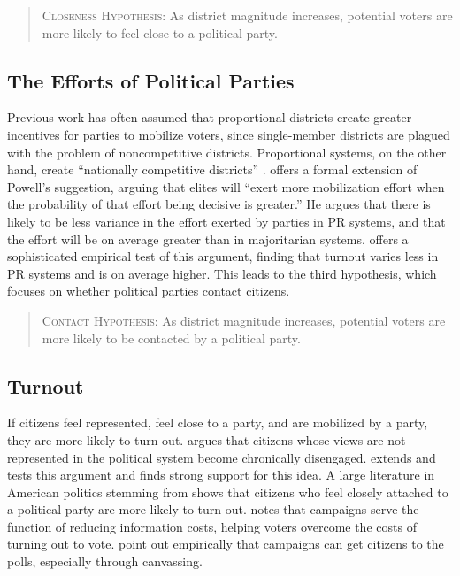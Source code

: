 \documentclass[12pt]{article}
\begin{document}
\begin{quote}
        \textsc{Closeness Hypothesis:} As district magnitude increases, potential voters are more likely to feel close to a political party.
\end{quote}

\subsection*{The Efforts of Political Parties}

Previous work has often assumed that proportional districts create greater incentives for parties to mobilize voters, since single-member districts are plagued with the problem of noncompetitive districts. Proportional systems, on the other hand, create ``nationally competitive districts'' \citep{Powell1982}. \cite{Cox1999} offers a formal extension of Powell's suggestion, arguing that elites will ``exert more mobilization effort when the probability of that effort being decisive is greater.'' He argues that there is likely to be less variance in the effort exerted by parties in PR systems, and that the effort will be on average greater than in majoritarian systems. \cite{Selb2009} offers a sophisticated empirical test of this argument, finding that turnout varies less in PR systems and is on average higher. This leads to the third hypothesis, which focuses on whether political parties contact citizens.

\begin{quote}
        \textsc{Contact Hypothesis:} As district magnitude increases, potential voters are more likely to be contacted by a political party.
\end{quote}

\subsection*{Turnout}

If citizens feel represented, feel close to a party, and are mobilized by a party, they are more likely to turn out. \cite{Schattschneider1960} argues that citizens whose views are not represented in the political system become chronically disengaged. \cite{Solt2008, Solt2010} extends and tests this argument and finds strong support for this idea. A large literature in American politics stemming from \cite{Campbelletal1960} shows that citizens who feel closely attached to a political party are more likely to turn out. \cite{Downs1957} notes that campaigns serve the function of reducing information costs, helping voters overcome the costs of turning out to vote. \cite{GerberGreen2000} point out empirically that campaigns can get citizens to the polls, especially through canvassing.
\end{document}
